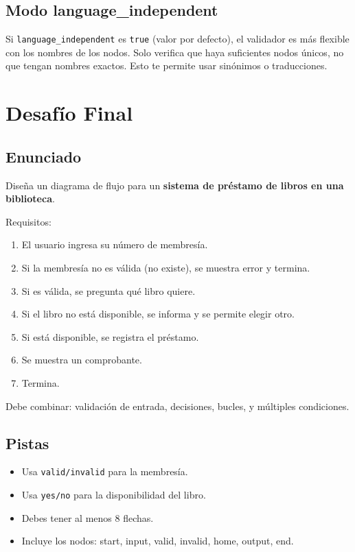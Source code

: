 \documentclass[12pt]{article}
\begin{document}
\subsection{Modo language\_independent}

Si \texttt{language\_independent} es \texttt{true} (valor por defecto), el validador es más flexible con los nombres de los nodos. Solo verifica que haya suficientes nodos únicos, no que tengan nombres exactos. Esto te permite usar sinónimos o traducciones.

\newpage

\section{Desafío Final}

\subsection{Enunciado}

Diseña un diagrama de flujo para un \textbf{sistema de préstamo de libros en una biblioteca}.

Requisitos:

\begin{enumerate}
    \item El usuario ingresa su número de membresía.
    \item Si la membresía no es válida (no existe), se muestra error y termina.
    \item Si es válida, se pregunta qué libro quiere.
    \item Si el libro no está disponible, se informa y se permite elegir otro.
    \item Si está disponible, se registra el préstamo.
    \item Se muestra un comprobante.
    \item Termina.
\end{enumerate}

Debe combinar: validación de entrada, decisiones, bucles, y múltiples condiciones.

\subsection{Pistas}

\begin{itemize}
    \item Usa \texttt{valid/invalid} para la membresía.
    \item Usa \texttt{yes/no} para la disponibilidad del libro.
    \item Debes tener al menos 8 flechas.
    \item Incluye los nodos: start, input, valid, invalid, home, output, end.
\end{itemize}
\end{document}

